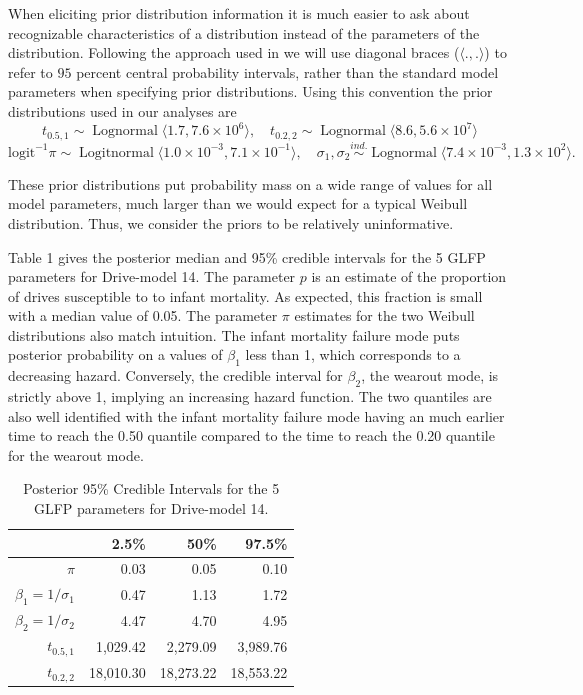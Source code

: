 \documentclass[12pt]{article}
\newcommand{\op}{\operatorname}
\begin{document}
When eliciting prior distribution information it is much easier to ask about recognizable characteristics of a distribution instead of the parameters of the distribution.  Following the approach used in \cite[Section 15.2.2]{intervals} we will use diagonal braces ($\langle.,.\rangle$) to refer to $95$ percent central probability intervals, rather than the standard model parameters when specifying prior distributions.  Using this convention the prior distributions used in our analyses are
$$t_{0.5,1} \sim \op{Lognormal} \langle 1.7,7.6\times 10^6 \rangle,\quad
t_{0.2,2} \sim \op{Lognormal}\langle 8.6, 5.6\times 10^7 \rangle$$
$$\mbox{logit}^{-1}\pi \sim \op{Logitnormal}\langle 1.0\times 10^{-3}, 7.1\times 10^{-1} \rangle,\quad
\sigma_1, \sigma_2 \stackrel{ind.}{\sim} \op{Lognormal}\langle 7.4 \times 10 ^{-3} ,1.3 \times 10^2 \rangle. $$

\noindent These prior distributions put probability mass on a wide range of values for all model parameters, much larger than we would expect for a typical Weibull distribution.  Thus, we consider the priors to be relatively uninformative. 


Table 1 gives the posterior median and 95\% credible intervals for the 5 GLFP parameters for Drive-model 14.  The parameter $p$ is an estimate of the proportion of drives susceptible to to infant mortality.  As expected, this fraction is small with a median value of 0.05.  The parameter $\pi$ estimates for the two Weibull distributions also match intuition.  The infant mortality failure mode puts posterior probability on a values of $\beta_1$ less than 1, which corresponds to a decreasing hazard.  Conversely, the credible interval for $\beta_2$, the wearout mode, is strictly above 1, implying an increasing hazard function.  The two quantiles are also well identified with the infant mortality failure mode having an much earlier time to reach the 0.50 quantile compared to the time to reach the 0.20 quantile for the wearout mode. 

\begin{table}[H]
\centering
\begin{tabular}{rrrr}
  \hline
 & 2.5\% & 50\% & 97.5\% \\ 
  \hline
$\pi$ & 0.03 & 0.05 & 0.10 \\ 
 $\beta_1 = 1/\sigma_1 $ & 0.47 & 1.13 & 1.72 \\ 
  $\beta_2 = 1/\sigma_2$ & 4.47 & 4.70 & 4.95 \\ 
  $t_{0.5,1}$ & 1,029.42 & 2,279.09 & 3,989.76 \\ 
  $t_{0.2,2}$ & 18,010.30 & 18,273.22 & 18,553.22 \\ 
   \hline
\end{tabular}
\caption{Posterior 95\% Credible Intervals for the 5 GLFP parameters for Drive-model 14.}
\label{table:1}
\end{table}
\end{document}
